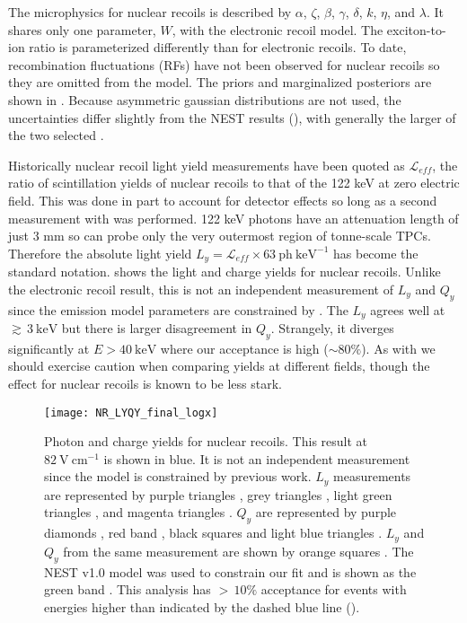 The microphysics for nuclear recoils is described by $\alpha$, $\zeta$, $\beta$, $\gamma$, $\delta$, $k$, $\eta$, and $\lambda$.  It shares
only one
parameter, $W$, with the electronic recoil model.  The exciton-to-ion ratio is parameterized differently than for electronic recoils.  To
date, recombination fluctuations (RFs) have not been observed for nuclear recoils so they are omitted from the model.  The priors and
marginalized posteriors are shown in .  Because
asymmetric gaussian distributions are not used, the uncertainties differ slightly from the NEST results
(), with generally the larger of the two selected
.

Historically nuclear recoil light yield measurements have been quoted as
$\mathcal{L}_{eff}$, the ratio of scintillation yields of nuclear recoils to that of the  122 keV \gammaray at zero
electric field.  This was done in part to account for detector effects so long as a second measurement with  was
performed.  122 keV photons have an attenuation length of just 3 mm so can probe only the very
outermost region of tonne-scale TPCs.  Therefore the absolute light yield $L_y = \mathcal{L}_{eff} \times 63\ \mathrm{ph\ keV^{-1}}$ has
become the standard notation.   shows the light and charge yields for nuclear
recoils.  Unlike the electronic recoil result, this is not an independent measurement of $L_y$ and $Q_y$ since the emission model
parameters are constrained by .  The
$L_y$ agrees well at ${\gtrsim}\, 3\ \mathrm{keV}$ but there is larger disagreement in $Q_y$.  Strangely, it diverges significantly at
$E > 40\ \mathrm{keV}$ where our acceptance is high (${\sim} 80\%$).  As with  we should
exercise caution when comparing yields at different fields, though the effect for nuclear recoils is known to be less stark.

\begin{figure}
\centering
\texttt{[image: NR\_LYQY\_final\_logx]}
\caption[Photon and charge yields for nuclear recoils.]{Photon and charge yields for nuclear recoils.  This result at
$82\ \mathrm{V\ cm^{-1}}$ is shown in blue.  It is not
an independent measurement since the model is constrained by previous work.  $L_y$ measurements are represented by purple triangles
, grey triangles , light green triangles , and magenta triangles
.  $Q_y$ are represented by purple diamonds , red band , black squares
 and light blue triangles .  $L_y$ and $Q_y$ from the same measurement are shown by orange
squares
.  The NEST v1.0 model was used to constrain our fit and is shown as the green band .  This
analysis has ${>}\, 10\%$ acceptance for events with energies higher than indicated by the dashed blue line
().}
\label{fig:er_nr_calibrations_results_ly_qy_nr}
\end{figure}